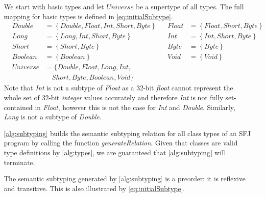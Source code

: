 \documentclass[runningheads]{llncs}
\begin{document}
We start with basic types and let $Universe$ be a supertype of all types.
The full mapping for basic types is defined in \autoref{eq:initialSubtype}.
\begin{equation}
    \label{eq:initialSubtype}
    \begin{array}{llllll}
        & Double   & = \left\{Double, Float, Int, Short, Byte\right\} &  & Float & = \left\{Float, Short, Byte\right\} \\
        & Long     & =    \left\{Long, Int, Short, Byte\right\}       &  & Int   & = \left\{Int, Short, Byte\right\}   \\
        & Short    & =    \left\{Short, Byte\right\}                  &  & Byte  & = \left\{Byte\right\}               \\
        & Boolean  & =    \left\{Boolean\right\}                      &  & Void  & = \left\{Void\right\}               \\
        & Universe & = \{Double, Float, Long, Int,                                                                     \\
        &          & \quad Short, Byte, Boolean, Void\}
   \end{array}
\end{equation}
Note that \emph{Int} is not a subtype of \emph{Float} as a 32-bit \emph{float} cannot represent the whole set of 32-bit \emph{integer} values accurately and therefore \emph{Int} is not fully set-contained in \emph{Float}, however this is not the case for \emph{Int} and \emph{Double}.
Similarly, \emph{Long} is not a subtype of \emph{Double}.

\autoref{alg:subtyping} builds the semantic subtyping relation for all class types of an SFJ program by calling the function \textit{generateRelation}.
Given that classes are valid type definitions by \autoref{alg:types}, we are guaranteed that \autoref{alg:subtyping} will terminate.

The semantic subtyping generated by \autoref{alg:subtyping} is a preorder: it is reflexive and transitive. This is also illustrated by \autoref{eq:initialSubtype}.
\end{document}
